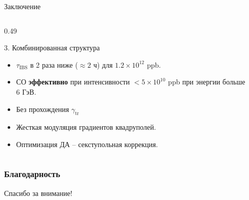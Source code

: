 \begin{frame}{Заключение}
\begin{columns}[t]
		\begin{column}{0.49\textwidth}
			\begin{block}{3. Комбинированная структура}
				\scriptsize
				\begin{itemize}
					\setlength{\itemsep}{0pt}
					\item $\tau_{\text{IBS}}$ в 2 раза ниже ($\approx 2$ ч) для $1.2 \times 10^{12}$ ppb.
					\item СО \textbf{эффективно} при интенсивности $<5\times10^{10}$ ppb при энергии больше $6 \text{ ГэВ}$.  
					\item Без прохождения $\gamma_{\text{tr}}$
					\item Жесткая модуляция градиентов квадруполей.
					\item Оптимизация ДА -- секступольная коррекция.
				\end{itemize}
			\end{block}
		\end{column}
	\end{columns}
\end{frame}
\begin{frame}
	\frametitle{Благодарность}
	\begin{center}
		Спасибо за внимание!
	\end{center}
	
\end{frame}
